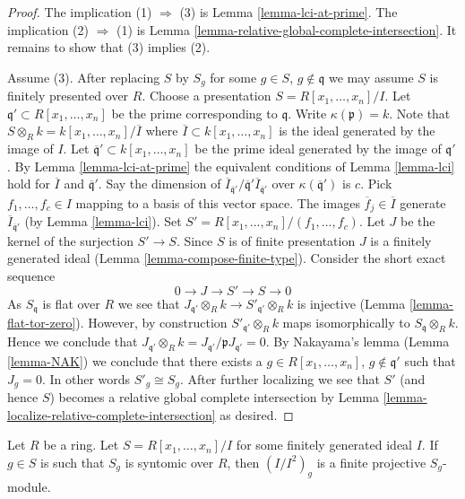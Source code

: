 \begin{proof}
The implication (1) $\Rightarrow$ (3) is Lemma \ref{lemma-lci-at-prime}.
The implication (2) $\Rightarrow$ (1) is
Lemma \ref{lemma-relative-global-complete-intersection}.
It remains to show that (3) implies (2).

\medskip\noindent
Assume (3). After replacing $S$ by $S_g$ for some $g \in S$,
$g\not\in \mathfrak q$ we may assume $S$ is finitely presented over $R$.
Choose a presentation $S = R[x_1, \ldots, x_n]/I$. Let
$\mathfrak q' \subset R[x_1, \ldots, x_n]$ be the prime corresponding
to $\mathfrak q$. Write $\kappa(\mathfrak p) = k$.
Note that $S \otimes_R k = k[x_1, \ldots, x_n]/\overline{I}$ where
$\overline{I} \subset k[x_1, \ldots, x_n]$ is the ideal generated
by the image of $I$. Let $\overline{\mathfrak q}' \subset k[x_1, \ldots, x_n]$
be the prime ideal generated by the image of $\mathfrak q'$.
By Lemma \ref{lemma-lci-at-prime} the equivalent conditions of
Lemma \ref{lemma-lci} hold for $\overline{I}$ and $\overline{\mathfrak q}'$.
Say the dimension of
$\overline{I}_{\overline{\mathfrak q}'}/
\overline{\mathfrak q}'\overline{I}_{\overline{\mathfrak q}'}$
over $\kappa(\overline{\mathfrak q}')$ is $c$.
Pick $f_1, \ldots, f_c \in I$ mapping to a basis of this vector space.
The images $\overline{f}_j \in \overline{I}$ generate
$\overline{I}_{\overline{\mathfrak q}'}$ (by Lemma \ref{lemma-lci}).
Set $S' = R[x_1, \ldots, x_n]/(f_1, \ldots, f_c)$. Let $J$ be the
kernel of the surjection $S' \to S$. Since $S$ is of finite presentation
$J$ is a finitely generated ideal
(Lemma \ref{lemma-compose-finite-type}). Consider the short exact sequence
$$
0 \to J \to S' \to S \to 0
$$
As $S_\mathfrak q$ is flat over $R$ we see that
$J_{\mathfrak q'} \otimes_R k \to S'_{\mathfrak q'} \otimes_R k$
is injective (Lemma \ref{lemma-flat-tor-zero}).
However, by construction $S'_{\mathfrak q'} \otimes_R k$
maps isomorphically to $S_\mathfrak q \otimes_R k$. Hence we
conclude that $J_{\mathfrak q'} \otimes_R k =
J_{\mathfrak q'}/\mathfrak pJ_{\mathfrak q'} = 0$. By Nakayama's
lemma (Lemma \ref{lemma-NAK}) we conclude that there exists a
$g \in R[x_1, \ldots, x_n]$, $g \not \in \mathfrak q'$ such that
$J_g = 0$. In other words $S'_g \cong S_g$. After further localizing
we see that $S'$ (and hence $S$) becomes a relative global complete
intersection by
Lemma \ref{lemma-localize-relative-complete-intersection}
as desired.
\end{proof}

\begin{lemma}
\label{lemma-syntomic-presentation-ideal-mod-squares}
Let $R$ be a ring. Let $S = R[x_1, \ldots, x_n]/I$ for some
finitely generated ideal $I$. If $g \in S$ is such that
$S_g$ is syntomic over $R$, then $(I/I^2)_g$ is a finite projective
$S_g$-module.
\end{lemma}

